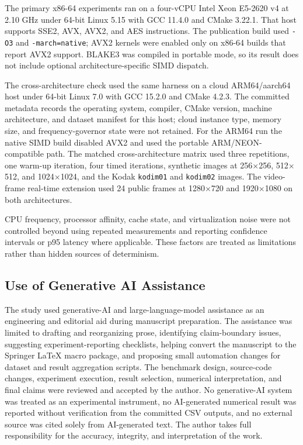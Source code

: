 \documentclass[twocolumn,runningheads]{svjour3}
\begin{document}
The primary x86-64 experiments ran on a four-vCPU Intel Xeon E5-2620 v4 at
2.10 GHz under 64-bit Linux 5.15 with GCC 11.4.0 and CMake 3.22.1. That host
supports SSE2, AVX, AVX2, and AES instructions. The publication build used
\texttt{-O3} and \texttt{-march=native}; AVX2 kernels were enabled only on
x86-64 builds that report AVX2 support. BLAKE3 was compiled in portable mode,
so its result does not include optional architecture-specific SIMD dispatch.

The cross-architecture check used the same harness on a cloud ARM64/aarch64
host under 64-bit Linux 7.0 with GCC 15.2.0 and CMake 4.2.3. The committed
metadata records the operating system, compiler, CMake version, machine
architecture, and dataset manifest for this host; cloud instance type, memory
size, and frequency-governor state were not retained. For the ARM64 run the
native SIMD build disabled AVX2 and used the portable ARM/NEON-compatible
path. The matched cross-architecture matrix used three repetitions, one
warm-up iteration, four timed iterations, synthetic images at 256$\times$256,
512$\times$512, and 1024$\times$1024, and the Kodak \texttt{kodim01} and
\texttt{kodim02} images. The video-frame real-time extension used 24 public
frames at 1280$\times$720 and 1920$\times$1080 on both architectures.

CPU frequency, processor affinity, cache state, and virtualization noise were
not controlled beyond using repeated measurements and reporting confidence
intervals or p95 latency where applicable. These factors are treated as
limitations rather than hidden sources of determinism.

\subsection{Use of Generative AI Assistance}
The study used generative-AI and large-language-model assistance as an
engineering and editorial aid during manuscript preparation. The assistance was
limited to drafting and reorganizing prose, identifying claim-boundary issues,
suggesting experiment-reporting checklists, helping convert the manuscript to
the Springer \LaTeX{} macro package, and proposing small automation changes
for dataset and result aggregation scripts. The benchmark design, source-code
changes, experiment execution, result selection, numerical interpretation, and
final claims were reviewed and accepted by the author. No generative-AI system
was treated as an experimental instrument, no AI-generated numerical result was
reported without verification from the committed CSV outputs, and no external
source was cited solely from AI-generated text. The author takes full
responsibility for the accuracy, integrity, and interpretation of the work.
\end{document}

